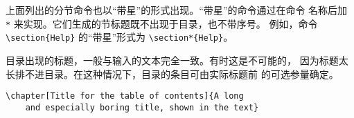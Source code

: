 上面列出的分节命令也以“带星”的形式出现。“带星”的命令通过在命令
名称后加 \verb|*| 来实现。它们生成的节标题既不出现于目录，也不带序号。
例如，命令 \verb|\section{Help}| 的“带星”形式为 \verb|\section*{Help}|。


目录出现的标题，一般与输入的文本完全一致。有时这是不可能的，
因为标题太长排不进目录。在这种情况下，目录的条目可由实际标题前
的可选参量确定。

\begin{code}
\verb|\chapter[Title for the table of contents]{A long|\\
\verb|    and especially boring title, shown in the text}|
\end{code}

